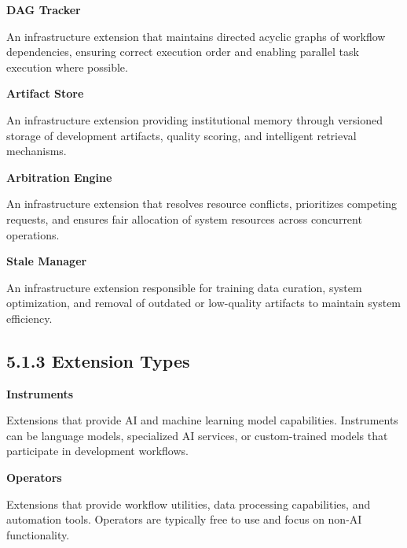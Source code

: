 \noindent\textbf{DAG Tracker}

An infrastructure extension that maintains directed acyclic graphs of workflow dependencies, ensuring correct execution order and enabling parallel task execution where possible.

\vspace{0.3cm}

\noindent\textbf{Artifact Store}

An infrastructure extension providing institutional memory through versioned storage of development artifacts, quality scoring, and intelligent retrieval mechanisms.

\vspace{0.3cm}

\noindent\textbf{Arbitration Engine}

An infrastructure extension that resolves resource conflicts, prioritizes competing requests, and ensures fair allocation of system resources across concurrent operations.

\vspace{0.3cm}

\noindent\textbf{Stale Manager}

An infrastructure extension responsible for training data curation, system optimization, and removal of outdated or low-quality artifacts to maintain system efficiency.

\subsection*{5.1.3 Extension Types}

\vspace{0.3cm}

\noindent\textbf{Instruments}

Extensions that provide AI and machine learning model capabilities. Instruments can be language models, specialized AI services, or custom-trained models that participate in development workflows.

\vspace{0.3cm}

\noindent\textbf{Operators}

Extensions that provide workflow utilities, data processing capabilities, and automation tools. Operators are typically free to use and focus on non-AI functionality.

\vspace{0.3cm}

